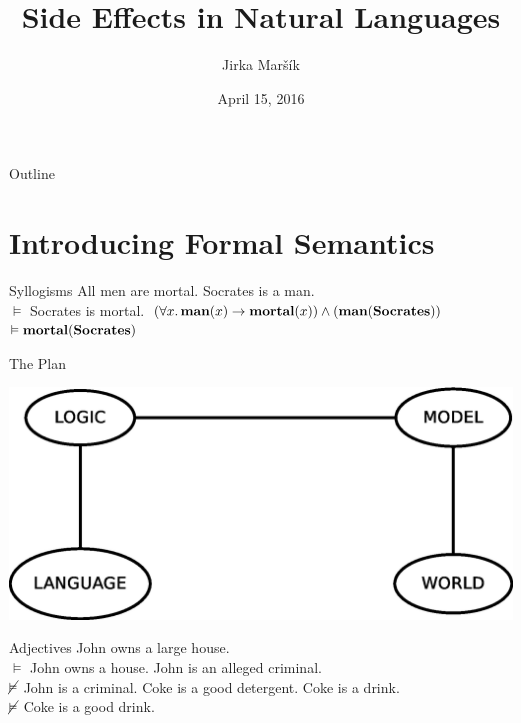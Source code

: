 \documentclass{beamer}
\title{Side Effects in Natural Languages}
\author{Jirka Maršík}
\date{April 15, 2016}
\institute{INRIA/LORIA}
\begin{document}
\begin{frame}
  \maketitle
\end{frame}


\begin{frame}{Outline}
  \tableofcontents
\end{frame}



\section{Introducing Formal Semantics}


\begin{frame}{Syllogisms}
All men are mortal. Socrates is a man. \\
$\vDash$ Socrates is mortal.
\vfill
\pause
$(\forall x.\, \textbf{man}(x) \to \textbf{mortal}(x)) \land
(\textbf{man}(\textbf{Socrates}))$ \\
$\vDash \textbf{mortal}(\textbf{Socrates})$
\end{frame}


\begin{frame}{The Plan}
  \begin{center}
  \includegraphics[width=\textheight]{plan}
  \end{center}
\end{frame}


\begin{frame}{Adjectives}
John owns a large house. \\
$\vDash$ John owns a house.
\vfill
\pause
John is an alleged criminal. \\
$\cancel{\vDash}$ John is a criminal.
\vfill
\pause
Coke is a good detergent. Coke is a drink. \\
$\cancel{\vDash}$ Coke is a good drink.
\end{frame}
\end{document}
